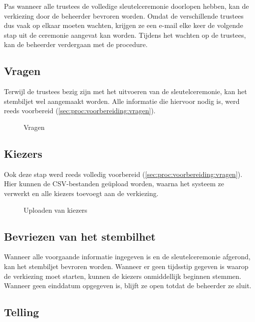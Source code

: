 Pas wanneer alle trustees de volledige sleutelceremonie doorlopen hebben, kan de verkiezing door de beheerder bevroren worden. Omdat de verschillende trustees dus vaak op elkaar moeten wachten, krijgen ze een e-mail elke keer de volgende stap uit de ceremonie aangevat kan worden. Tijdens het wachten op de trustees, kan de beheerder verdergaan met de procedure.

\subsection{Vragen}

Terwijl de trustees bezig zijn met het uitvoeren van de sleutelceremonie, kan het stembiljet wel aangemaakt worden. Alle informatie die hiervoor nodig is, werd reeds voorbereid (\ref{sec:proc:voorbereiding:vragen}).

\begin{figure}
  \caption{Vragen}
  \label{fig:proc:questions}
\end{figure}

\subsection{Kiezers}

Ook deze stap werd reeds volledig voorbereid (\ref{sec:proc:voorbereiding:vragen}). Hier kunnen de CSV-bestanden ge\"upload worden, waarna het systeem ze verwerkt en alle kiezers toevoegt aan de verkiezing.

\begin{figure}
  \caption{Uploaden van kiezers}
  \label{fig:proc:voters_upload}
\end{figure}

\subsection{Bevriezen van het stembilhet}

Wanneer alle voorgaande informatie ingegeven is en de sleutelceremonie afgerond, kan het stembiljet bevroren worden. Wanneer er geen tijdsstip gegeven is waarop de verkiezing moet starten, kunnen de kiezers onmiddellijk beginnen stemmen. Wanneer geen einddatum opgegeven is, blijft ze open totdat de beheerder ze sluit.

\subsection{Telling}


